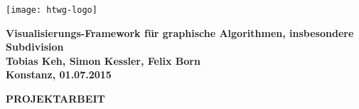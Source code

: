 \begin{titlepage}

\vspace*{-3.5cm}

\begin{flushleft}
\hspace*{-1cm} \texttt{[image: htwg-logo]}
\end{flushleft}

\vspace{2.5cm}

\begin{center}
	\huge{
		\textbf{Visualisierungs-Framework für graphische Algorithmen, insbesondere Subdivision} \\[5cm]
	}
	\Large{
		\textbf{Tobias Keh, Simon Kessler, Felix Born}} \\[6.5cm]
	\large{
		\textbf{Konstanz, 01.07.2015} \\[2.3cm]
	}
	
	\Huge{
		\textbf{{\sf PROJEKTARBEIT}}
	}
\end{center}

\end{titlepage}